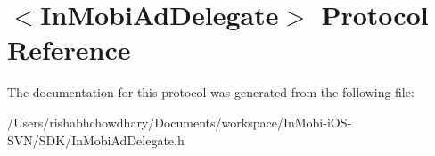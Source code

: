 \hypertarget{protocol_in_mobi_ad_delegate-p}{
\section{$<$InMobiAdDelegate$>$ Protocol Reference}
\label{protocol_in_mobi_ad_delegate-p}
}


The documentation for this protocol was generated from the following file:\begin{DoxyCompactItemize}
\item 
/Users/rishabhchowdhary/Documents/workspace/InMobi-\/iOS-\/SVN/SDK/InMobiAdDelegate.h\end{DoxyCompactItemize}
